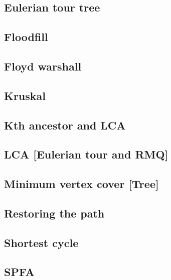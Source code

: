 \subsection{Eulerian tour tree}
\raggedbottom
\hrulefill
\subsection{Floodfill}
\raggedbottom
\hrulefill
\subsection{Floyd warshall}
\raggedbottom
\hrulefill
\subsection{Kruskal}
\raggedbottom
\hrulefill
\subsection{Kth ancestor and LCA}
\raggedbottom
\hrulefill
\subsection{LCA [Eulerian tour and RMQ]}
\raggedbottom
\hrulefill
\subsection{Minimum vertex cover [Tree]}
\raggedbottom
\hrulefill
\subsection{Restoring the path}
\raggedbottom
\hrulefill
\subsection{Shortest cycle}
\raggedbottom
\hrulefill
\subsection{SPFA}
\raggedbottom
\hrulefill
